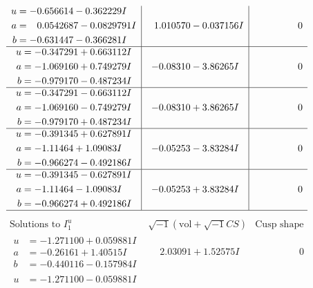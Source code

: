 \documentclass[1p]{elsarticle_modified}
\theoremstyle{definition}
\newcommand{\I}{\sqrt{-1}}
\begin{document}
$$\begin{array}{c|c|c}
\begin{aligned}
u &= -0.656614 - 0.362229 I \\
a &= \phantom{-}0.0542687 - 0.0829791 I \\
b &= -0.631447 - 0.366281 I\end{aligned}
 & \phantom{-}1.010570 - 0.037156 I & \phantom{-0.000000 } 0 \\ \hline\begin{aligned}
u &= -0.347291 + 0.663112 I \\
a &= -1.069160 + 0.749279 I \\
b &= -0.979170 - 0.487234 I\end{aligned}
 & -0.08310 - 3.86265 I & \phantom{-0.000000 } 0 \\ \hline\begin{aligned}
u &= -0.347291 - 0.663112 I \\
a &= -1.069160 - 0.749279 I \\
b &= -0.979170 + 0.487234 I\end{aligned}
 & -0.08310 + 3.86265 I & \phantom{-0.000000 } 0 \\ \hline\begin{aligned}
u &= -0.391345 + 0.627891 I \\
a &= -1.11464 + 1.09083 I \\
b &= -0.966274 - 0.492186 I\end{aligned}
 & -0.05253 - 3.83284 I & \phantom{-0.000000 } 0 \\ \hline\begin{aligned}
u &= -0.391345 - 0.627891 I \\
a &= -1.11464 - 1.09083 I \\
b &= -0.966274 + 0.492186 I\end{aligned}
 & -0.05253 + 3.83284 I & \phantom{-0.000000 } 0\\
 \hline 
 \end{array}$$\newpage$$\begin{array}{c|c|c}  
\text{Solutions to }I^u_{1}& \I (\text{vol} + \sqrt{-1}CS) & \text{Cusp shape}\\
 \hline 
\begin{aligned}
u &= -1.271100 + 0.059881 I \\
a &= -0.26161 + 1.40515 I \\
b &= -0.440116 - 0.157984 I\end{aligned}
 & \phantom{-}2.03091 + 1.52575 I & \phantom{-0.000000 } 0 \\ \hline\begin{aligned}
u &= -1.271100 - 0.059881 I \\

\end{aligned}
\end{array}$$
\end{document}
